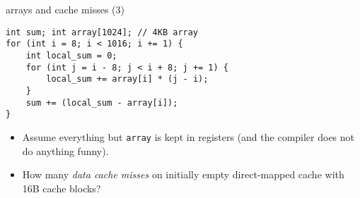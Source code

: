 \begin{frame}[fragile,label=arrayMisses4]{arrays and cache misses (3)}
\begin{lstlisting}
int sum; int array[1024]; // 4KB array
for (int i = 8; i < 1016; i += 1) {
    int local_sum = 0;
    for (int j = i - 8; j < i + 8; j += 1) {
        local_sum += array[i] * (j - i);
    }
    sum += (local_sum - array[i]);
}
\end{lstlisting}
    \begin{itemize}
        \item {\small
    Assume everything but {\tt array} is kept in registers (and the compiler does not do
    anything funny).
        }
    \item
        How many \textit{data cache misses} on initially empty  direct-mapped cache with 16B cache blocks?
    \end{itemize}
\end{frame}

